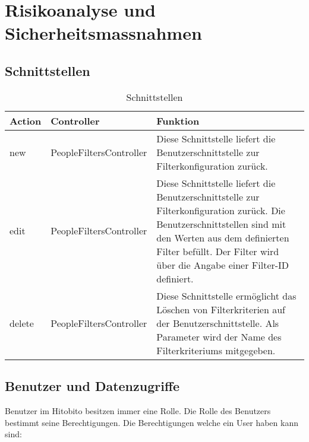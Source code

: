 \chapter{Risikoanalyse und Sicherheitsmassnahmen}
\section{Schnittstellen}

\begin{table}[h!]
  \begin{tabular}{|L{0.2\textwidth}|L{0.3\textwidth}|L{0.4\textwidth}|}
      \color{white} Action & \color{white} Controller & \color{white} Funktion \\ [12pt]
      \hline
      new & PeopleFiltersController & Diese Schnittstelle liefert die Benutzerschnittstelle zur Filterkonfiguration zurück.  \\
      \hline 
      edit & PeopleFiltersController & Diese Schnittstelle liefert die Benutzerschnittstelle zur Filterkonfiguration zurück. Die Benutzerschnittstellen
      sind mit den Werten aus dem definierten Filter befüllt. Der Filter wird über die Angabe einer Filter-ID definiert.  \\
      \hline 
      delete & PeopleFiltersController & Diese Schnittstelle ermöglicht das Löschen von Filterkriterien auf der Benutzerschnittstelle. Als Parameter
      wird der Name des Filterkriteriums mitgegeben.   \\
      \hline 
    \end{tabular}
    \caption{Schnittstellen}
\end{table}

\newpage

\section{Benutzer und Datenzugriffe}
Benutzer im Hitobito besitzen immer eine Rolle. Die Rolle des Benutzers bestimmt seine Berechtigungen. Die Berechtigungen welche ein User haben kann sind:

